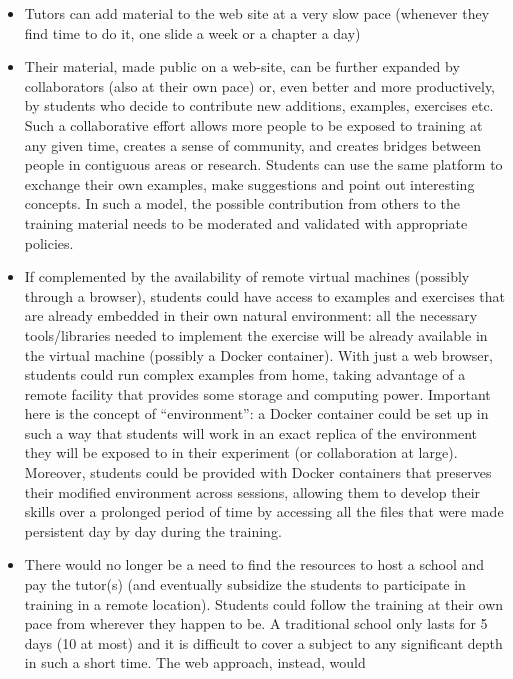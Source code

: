 \documentclass[12pt,a4paper]{article}
\begin{document}
\begin{itemize}
   \item Tutors can add material to the web site at a very slow pace (whenever
   they find time to do it, one slide a week or a chapter a day) \item Their
   material, made public on a web-site, can be further expanded by collaborators
   (also at their own pace) or, even better and more productively, by students
   who decide to contribute new additions, examples, exercises etc. Such a
   collaborative effort allows more people to be exposed to training at any
   given time, creates a sense of community, and creates bridges between people
   in contiguous areas or research. Students can use the same platform to
   exchange their own examples, make suggestions and point out interesting
   concepts. In such a model, the possible contribution from others to the
   training material needs to be moderated and validated with appropriate
   policies.
   \item If complemented by the availability of remote virtual machines
   (possibly through a browser), students could have access to examples and
   exercises that are already embedded in their own natural environment: all the
   necessary tools/libraries needed to implement the exercise will be already
   available in the virtual machine (possibly a Docker container). With just a
   web browser, students could run complex examples from home, taking advantage
   of a remote facility that provides some storage and computing power.
   Important here is the concept of ``environment'': a Docker container could be
   set up in such a way that students will work in an exact replica of the
   environment they will be exposed to in their experiment (or collaboration at
   large). Moreover, students could be provided with Docker containers that
   preserves their modified environment across sessions, allowing them to
   develop their skills over a prolonged period of time by accessing all the
   files that were made persistent day by day during the training.
   \item There would no longer be a need to find the resources to host a school
   and pay the tutor(s) (and eventually subsidize the students to participate in
   training in a remote location). Students could follow the training at their
   own pace from wherever they happen to be. A traditional school only lasts for
   5 days (10 at most) and it is difficult to cover a  subject to any
   significant depth in such a short time. The web approach, instead, would

\end{itemize}
\end{document}
